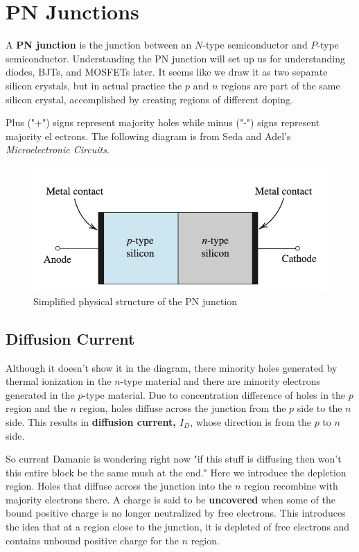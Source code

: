 \chapter{PN Junctions}

A \textbf{PN junction} is the junction between an $N$-type semiconductor and $P$-type semiconductor. Understanding the PN junction will set up us for understanding diodes, BJTs, and MOSFETs later. It seems like we draw it as two separate silicon crystals, but in actual practice the $p$ and $n$ regions are part of the same silicon crystal, accomplished by creating regions of different doping.

Plus ("+") signs represent majority holes while minus ("-") signs represent majority el ectrons. The following diagram is from Seda and Adel's \textit{Microelectronic Circuits}.

\begin{figure}[htb]
    \centering
    \includegraphics{figs/ch03/pn_junction.png}
    \caption{Simplified physical structure of the PN junction}
\end{figure}

\section{Diffusion Current}
Although it doesn't show it in the diagram, there minority holes generated by thermal ionization in the $n$-type material and there are minority electrons generated in the $p$-type material. Due to concentration difference of holes in the $p$ region and the $n$ region, holes diffuse across the junction from the $p$ side to the $n$ side. This results in \textbf{diffusion current, $I_D$}, whose direction is from the $p$ to $n$ side.

So current Damanic is wondering right now "if this stuff is diffusing then won't this entire block be the same mush at the end." Here we introduce the depletion region. Holes that diffuse across the junction into the $n$ region recombine with majority electrons there. A charge is said to be \textbf{uncovered} when some of the bound positive charge is no longer neutralized by free electrons. This introduces the idea that at a region close to the junction, it is depleted of free electrons and contains unbound positive charge for the $n$ region.

